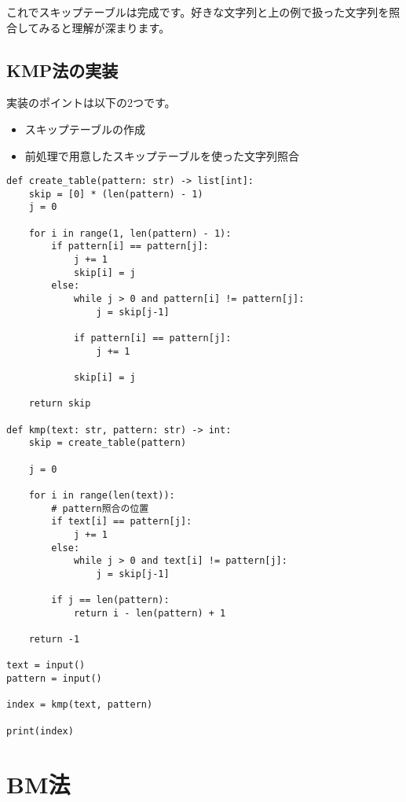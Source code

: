 \documentclass{jlreq}
\begin{document}
\vspace{0.5cm}
これでスキップテーブルは完成です。好きな文字列と上の例で扱った文字列を照合してみると理解が深まります。

\subsection{KMP法の実装}

実装のポイントは以下の2つです。

\begin{itemize}
    \item スキップテーブルの作成
    \item 前処理で用意したスキップテーブルを使った文字列照合
\end{itemize}

\begin{lstlisting}[caption=KMP法の実装, frame=TRBL, label={KMP}]
    def create_table(pattern: str) -> list[int]:
    skip = [0] * (len(pattern) - 1)
    j = 0
    
    for i in range(1, len(pattern) - 1):
        if pattern[i] == pattern[j]:
            j += 1
            skip[i] = j
        else:
            while j > 0 and pattern[i] != pattern[j]:
                j = skip[j-1]
            
            if pattern[i] == pattern[j]:
                j += 1
            
            skip[i] = j
    
    return skip

def kmp(text: str, pattern: str) -> int:
	skip = create_table(pattern)
 
	j = 0
 
	for i in range(len(text)):
		# pattern照合の位置
		if text[i] == pattern[j]:
			j += 1
		else:
			while j > 0 and text[i] != pattern[j]:
				j = skip[j-1]
   
		if j == len(pattern):
			return i - len(pattern) + 1

	return -1

text = input()
pattern = input()

index = kmp(text, pattern)

print(index)
\end{lstlisting}

\newpage

\section{BM法}
\end{document}

